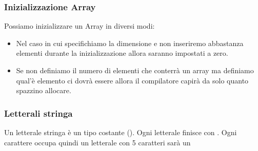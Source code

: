 \subsubsection{Inizializzazione Array}
Possiamo inizializzare un Array in diversi modi:

\begin{itemize}
    \item Nel caso in cui specifichiamo la dimensione e non inseriremo abbastanza elementi durante la inizializzazione allora saranno impostati a zero.
    \item Se non definiamo il numero di elementi che conterrà un array ma definiamo qual'è elemento ci dovrà essere allora il compilatore capirà da solo quanto spazzino allocare.
\end{itemize}
\subsubsection{Letterali stringa}
Un letterale stringa è un tipo costante (). Ogni letterale finisce con . \newline
Ogni carattere occupa  quindi un letterale con 5 caratteri sarà un \newline{}
